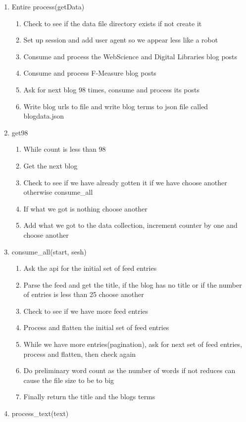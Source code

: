 \documentclass[letterpaper,10pt]{article}
\begin{document}
\begin{enumerate}
\item Entire process(getData)
\begin{enumerate}
\item Check to see if the data file directory exists if not create it
\item Set up session and add user agent so we appear less like a robot
\item Consume and process the WebScience and Digital Libraries blog posts
\item Consume and process F-Measure blog posts
\item Ask for next blog 98 times, consume and process its posts
\item Write blog urls to file and write blog terms to json file called blogdata.json
\end{enumerate}
\item get98
\begin{enumerate}
\item While count is less than 98
\item Get the next blog
\item Check to see if we have already gotten it if we have choose another otherwise consume\_all
\item If what we got is nothing choose another
\item Add what we got to the data collection, increment counter by one and choose another
\end{enumerate}
\item consume\_all(start, sesh)
\begin{enumerate}
\item Ask the api for the initial set of feed entries
\item Parse the feed and get the title, if the blog has no title or if the number of entries is less than 25 choose another
\item Check to see if we have more feed entries
\item Process and flatten the initial set of feed entries
\item While we have more entries(pagination), ask for next set of feed entries, process and flatten, then check again
\item Do preliminary word count as the number of words if not reduces can cause the file size to be to big
\item Finally return the title and the blogs terms
\end{enumerate}
\item process\_text(text)

\end{enumerate}
\end{document}
